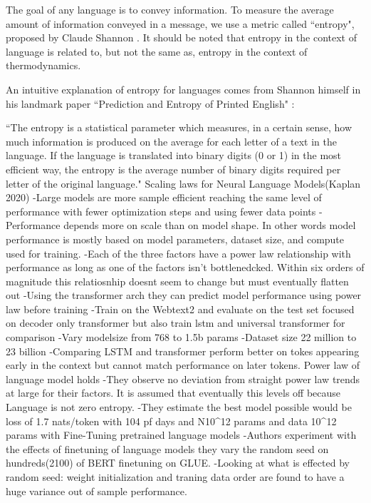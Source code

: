 The goal of any language is to convey information. To measure the average amount of information conveyed in a message, we use a metric called “entropy", proposed by Claude Shannon . It should be noted that entropy in the context of language is related to, but not the same as, entropy in the context of thermodynamics.


An intuitive explanation of entropy for languages comes from Shannon himself in his landmark paper “Prediction and Entropy of Printed English" :

“The entropy is a statistical parameter which measures, in a certain sense, how much information is produced on the average for each letter of a text in the language. If the language is translated into binary digits (0 or 1) in the most efficient way, the entropy is the average number of binary digits required per letter of the original language."
Scaling laws for Neural Language Models(Kaplan 2020)
-Large models are more sample efficient reaching the same level of performance with fewer optimization steps and using fewer data points
-Performance depends more on scale than on model shape. In other words model performance is mostly based on model parameters, dataset size, and compute used for training.
-Each of the three factors have a power law relationship with performance as long as one of the factors isn't bottlenedcked. Within six orders of magnitude this relatiosnhip doesnt seem to change but must eventually flatten out
-Using the transformer arch they can predict model performance using power law before training
-Train on the Webtext2 and evaluate on the test set focused on decoder only transformer but also train lstm and universal transformer for comparison
-Vary modelsize from 768 to 1.5b params 
-Dataset size 22 million to 23 billion
-Comparing LSTM and transformer perform better on tokes appearing early in the context but cannot match performance on later tokens. Power law of language model holds
-They observe no deviation from straight power law trends at large for their factors. It is assumed that eventually this levels off because Language is not zero entropy.
-They estimate the best model possible would be loss of 1.7 nats/token with 104 pf days and N10^12 params and data 10^12 params with
Fine-Tuning pretrained language models 
-Authors experiment with the effects of finetuning of language models they vary the random seed on hundreds(2100) of BERT finetuning on GLUE. 
-Looking at what is effected by random seed: weight initialization and traning data order are found to have a huge variance out of sample performance. 
